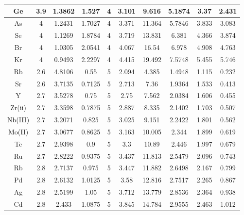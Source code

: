 \documentclass[journal]{IEEEtran}
\begin{document}
{\begin{longtable}{|c|c|c|c|c|c|c|c|c|c|}
			\hline
	\rowcolor{yellow!50}	Ge       & 3.9 & 1.3862 & 1.527  & 4 & 3.101  & 9.616   & 5.1874  & 3.37   & 2.431   \\
			\hline
	\rowcolor{yellow!50}	As       & 4   & 1.2431 & 1.7027 & 4 & 3.371  & 11.364  & 5.7846  & 3.833  & 3.083   \\
			\hline
	\rowcolor{yellow!50}	Se       & 4   & 1.1269 & 1.8784 & 4 & 3.719  & 13.831  & 6.381   & 4.366  & 3.874   \\
			\hline
	\rowcolor{yellow!50}	Br       & 4   & 1.0305 & 2.0541 & 4 & 4.067  & 16.54   & 6.978   & 4.908  & 4.763   \\
			\hline
	\rowcolor{yellow!50}	Kr       & 4   & 0.9493 & 2.2297 & 4 & 4.415  & 19.492  & 7.5748  & 5.455  & 5.746   \\
			\hline
		\rowcolor{green!50}	Rb       & 2.6 & 4.8106 & 0.55   & 5 & 2.094  & 4.385   & 1.4948  & 1.115  & 0.232   \\
			\hline
		\rowcolor{green!50}	Sr       & 2.6 & 3.7135 & 0.7125 & 5 & 2.713  & 7.36    & 1.9364  & 1.533  & 0.413   \\
			\hline
		\rowcolor{green!50}	Y        & 2.7 & 3.5278 & 0.75   & 5 & 2.75   & 7.562   & 2.0384  & 1.606  & 0.455   \\
			\hline
		\rowcolor{green!50}	Zr(ii)   & 2.7 & 3.3598 & 0.7875 & 5 & 2.887  & 8.335   & 2.1402  & 1.703  & 0.507   \\
			\hline
		\rowcolor{green!50}	Nb(III)  & 2.7 & 3.2071 & 0.825  & 5 & 3.025  & 9.151   & 2.2422  & 1.801  & 0.562   \\
			\hline
		\rowcolor{green!50}	Mo(II)   & 2.7 & 3.0677 & 0.8625 & 5 & 3.163  & 10.005  & 2.344   & 1.899  & 0.619   \\
			\hline
		\rowcolor{green!50}	Tc       & 2.7 & 2.9398 & 0.9    & 5 & 3.3    & 10.89   & 2.446   & 1.997  & 0.679   \\
			\hline
		\rowcolor{green!50}	Ru       & 2.7 & 2.8222 & 0.9375 & 5 & 3.437  & 11.813  & 2.5479  & 2.096  & 0.743   \\
			\hline
		\rowcolor{green!50}	Rb       & 2.8 & 2.7137 & 0.975  & 5 & 3.447  & 11.882  & 2.6498  & 2.167  & 0.799   \\
			\hline
		\rowcolor{green!50}	Pd       & 2.8 & 2.6132 & 1.0125 & 5 & 3.58   & 12.816  & 2.7517  & 2.265  & 0.867   \\
			\hline
		\rowcolor{green!50}	Ag       & 2.8 & 2.5199 & 1.05   & 5 & 3.712  & 13.779  & 2.8536  & 2.364  & 0.938   \\
			\hline
		\rowcolor{green!50}	Cd       & 2.8 & 2.433  & 1.0875 & 5 & 3.845  & 14.784  & 2.9555  & 2.463  & 1.012   \\

\end{longtable}}
\end{document}
